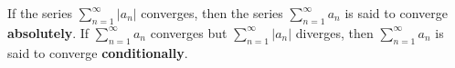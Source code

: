 \documentclass{report}
\begin{document}
\begin{definition}
If the series $\sum_{n=1}^{\infty}\lvert a_n \rvert$ converges, then the series $\sum_{n=1}^{\infty}a_n$ is said to converge \textbf{absolutely}. If  $\sum_{n=1}^{\infty}a_n$ converges but $\sum_{n=1}^{\infty}\lvert a_n \rvert$ diverges, then $\sum_{n=1}^{\infty}a_n$ is said to converge \textbf{conditionally}.
\end{definition}
\end{document}
